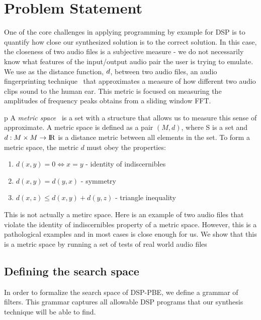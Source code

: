 
\section{Problem Statement}

One of the core challenges in applying programming by example for DSP is to quantify how close our synthesized solution is to the correct solution.
In this case, the closeness of two audio files is a subjective measure - we do not necessarily know what features of the input/output audio pair the user is trying to emulate.
We use as the distance function, ${d}$, between two audio files, an audio fingerprinting technique~\cite{SantolucitoFARM} that approximates a measure of how different two audio clips sound to the human ear.
This metric is focused on measuring the amplitudes of frequency peaks obtains from a sliding window FFT.


p
A \textit{metric space}~\cite{textbook} is a set with a structure that allows us to measure this sense of approximate.
A metric space is defined as a pair $(M,d)$, where S is a set and $d:M \times M \to {\rm I\!R}$ is a distance metric between all elements in the set. 
To form a metric space, the metric $d$ must obey the properties:

\begin{enumerate}
  \item $d(x,y) = 0 \Leftrightarrow x = y$ - identity of indiscernibles
  \item $d(x,y)  = d(y,x)$ - symmetry
  \item $d(x,z) \le d(x,y) + d(y, z)$ - triangle inequality
\end{enumerate}



This is not actually a metirc space. Here is an example of two audio files that violate the identity of indiscernibles property of a metric space.
However, this is a pathological examples and in most cases is close enough for us. 
We show that this is a metric space by running a set of tests of real world audio files

\subsection{Defining the search space}

In order to formalize the search space of DSP-PBE, we define a grammar of filters.
This grammar captures all allowable DSP programs that our synthesis technique will be able to find.

